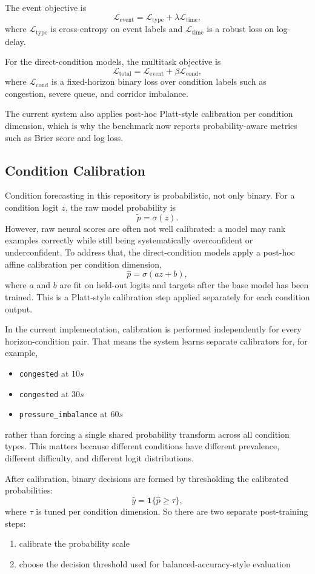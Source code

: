 \documentclass[11pt]{article}
\begin{document}
The event objective is
\[
\mathcal{L}_{\mathrm{event}} =
\mathcal{L}_{\mathrm{type}} + \lambda \mathcal{L}_{\mathrm{time}},
\]
where \(\mathcal{L}_{\mathrm{type}}\) is cross-entropy on event labels and \(\mathcal{L}_{\mathrm{time}}\) is a robust loss on log-delay.

For the direct-condition models, the multitask objective is
\[
\mathcal{L}_{\mathrm{total}} =
\mathcal{L}_{\mathrm{event}} + \beta \mathcal{L}_{\mathrm{cond}},
\]
where \(\mathcal{L}_{\mathrm{cond}}\) is a fixed-horizon binary loss over condition labels such as congestion, severe queue, and corridor imbalance.

The current system also applies post-hoc Platt-style calibration per condition dimension, which is why the benchmark now reports probability-aware metrics such as Brier score and log loss.

\subsection{Condition Calibration}

Condition forecasting in this repository is probabilistic, not only binary. For a condition logit \(z\), the raw model probability is
\[
\tilde{p} = \sigma(z).
\]
However, raw neural scores are often not well calibrated: a model may rank examples correctly while still being systematically overconfident or underconfident. To address that, the direct-condition models apply a post-hoc affine calibration per condition dimension,
\[
\hat{p} = \sigma(a z + b),
\]
where \(a\) and \(b\) are fit on held-out logits and targets after the base model has been trained. This is a Platt-style calibration step applied separately for each condition output.

In the current implementation, calibration is performed independently for every horizon-condition pair. That means the system learns separate calibrators for, for example,
\begin{itemize}
  \item \texttt{congested} at \(10s\)
  \item \texttt{congested} at \(30s\)
  \item \texttt{pressure\_imbalance} at \(60s\)
\end{itemize}
rather than forcing a single shared probability transform across all condition types. This matters because different conditions have different prevalence, different difficulty, and different logit distributions.

After calibration, binary decisions are formed by thresholding the calibrated probabilities:
\[
\hat{y} = \mathbf{1}\{\hat{p} \ge \tau\},
\]
where \(\tau\) is tuned per condition dimension. So there are two separate post-training steps:
\begin{enumerate}
  \item calibrate the probability scale
  \item choose the decision threshold used for balanced-accuracy-style evaluation
\end{enumerate}
\end{document}

